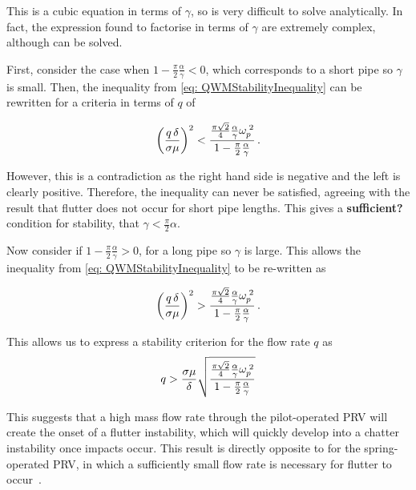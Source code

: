 This is a cubic equation in terms of $\gamma$, so is very difficult to solve analytically. In fact, the expression found to factorise in terms of $\gamma$ are extremely complex, although can be solved.

First, consider the case when $1 - \frac{\pi}{2} \frac{\alpha}{\gamma} < 0$, which corresponds to a short pipe so $\gamma$ is small. Then, the inequality from \cref{eq: QWMStabilityInequality} can be rewritten for a criteria in terms of $q$ of

\begin{equation*}
    \left( \frac{q \, \delta}{\sigma \mu} \right)^2 < \frac{\frac{\pi \sqrt{2}}{4} \frac{\alpha}{\gamma} \omega_p^{\;2}}{1 - \frac{\pi}{2}\frac{\alpha}{\gamma}} \, .
\end{equation*}

However, this is a contradiction as the right hand side is negative and the left is clearly positive. Therefore, the inequality can never be satisfied, agreeing with the result that flutter does not occur for short pipe lengths. This gives a \textbf{sufficient?} condition for stability, that $\gamma < \frac{\pi}{2} \alpha$.

Now consider if $1 - \frac{\pi}{2} \frac{\alpha}{\gamma} > 0$, for a long pipe so $\gamma$ is large. This allows the inequality from \cref{eq: QWMStabilityInequality} to be re-written as

\begin{equation*}
    \left( \frac{q \, \delta}{\sigma \mu} \right)^2 > \frac{\frac{\pi \sqrt{2}}{4} \frac{\alpha}{\gamma} \omega_p^{\;2}}{1 - \frac{\pi}{2}\frac{\alpha}{\gamma}} \, .
\end{equation*}

This allows us to express a stability criterion for the flow rate $q$ as
~
\begin{equation*}
    q > \frac{\sigma \mu}{\delta} \sqrt{\frac{\frac{\pi \sqrt{2}}{4}\frac{\alpha}{\gamma}\omega_p^{\;2}}{1 - \frac{\pi}{2}\frac{\alpha}{\gamma}}}
\end{equation*}

This suggests that a high mass flow rate through the pilot-operated PRV will create the onset of a flutter instability, which will quickly develop into a chatter instability once impacts occur. This result is directly opposite to for the spring-operated PRV, in which a sufficiently small flow rate is necessary for flutter to occur~\cite{Hos2015ModelPipe,Hos2016DynamicService}.

